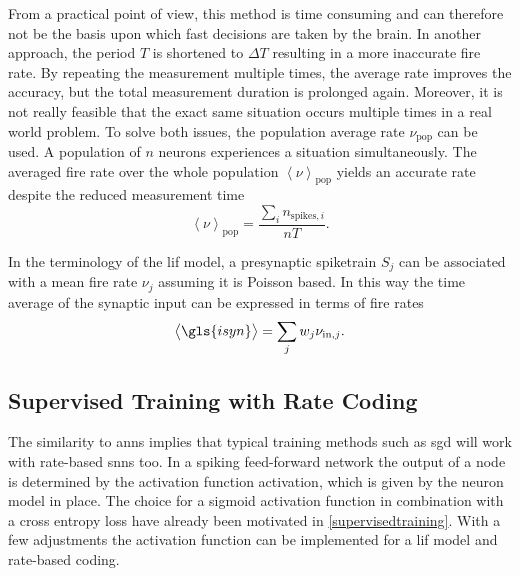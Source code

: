 From a practical point of view, this method is time consuming and can therefore not be the basis upon which fast decisions are taken by the brain. In another approach, the period $T$ is shortened to $\Delta T$ resulting in a more inaccurate fire rate. By repeating the measurement multiple times, the average rate improves the accuracy, but the total measurement duration is prolonged again. Moreover, it is not really feasible that the exact same situation occurs multiple times in a real world problem. To solve both issues, the population average rate $\nu_\text{pop}$ can be used. A population of $n$ neurons experiences a situation simultaneously. The averaged fire rate over the whole population $\left\langle\nu \right\rangle_\text{pop}$ yields an accurate rate despite the reduced measurement time
\begin{equation*}
\left\langle\nu \right\rangle_\text{pop} = \frac{\sum_i n_{\text{spikes},i}}{nT}.
\end{equation*}

In the terminology of the \gls{lif} model, a presynaptic spiketrain $S_j$ can be associated with a mean fire rate $\nu_j$ assuming it is Poisson based. In this way the time average of the synaptic input can be expressed in terms of fire rates 
\begin{equation*}
\left\langle \gls{isyn} \right\rangle = \sum_j w_j \nu_{\text{in}, j}.
\end{equation*}



\subsection{Supervised Training with Rate Coding}
\label{ratebasedtraining}
The similarity to \glspl{ann} implies that typical training methods such as \acrfull{sgd} will work with rate-based \glspl{snn} too. In a spiking feed-forward network the output of a node is determined by the activation function \gls{activation}, which is given by the neuron model in place.
The choice for a sigmoid activation function in combination with a cross entropy loss have already been motivated in \cref{supervisedtraining}. With a few adjustments the activation function can be implemented for a \gls{lif} model and rate-based coding.

